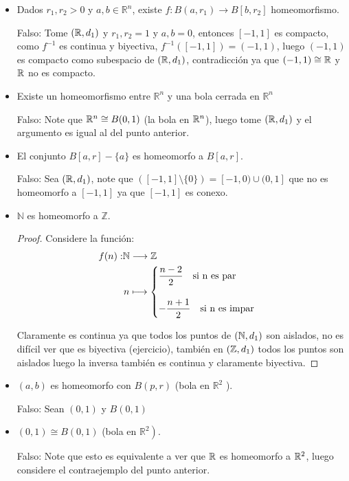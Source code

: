 \begin{itemize}[label={✎},leftmargin=*]
    \item Dados $r_1, r_2>0$ y $a, b \in \mathbb{R}^n$, existe $f: B\left(a, r_1\right) \rightarrow B\left[b, r_2\right]$ homeomorfismo.

Falso: Tome $(\mathbb{R},d_1)$ y $r_1,r_2=1$ y $a,b=0$, entonces $[-1,1]$ es compacto, como $f^{-1}$ es continua y biyectiva, $f^{-1}([-1,1])=(-1,1)$, luego $(-1,1)$ es compacto como subespacio de $(\mathbb{R},d_1)$, contradicción ya que $(-1,1)\cong \mathbb{R}$ y $\mathbb{R}$ no es compacto. 

\item Existe un homeomorfismo entre $\mathbb{R}^n$ y una bola cerrada en $\mathbb{R}^n$

Falso: Note que $\mathbb{R}^n\cong B(0,1)$ (la bola en $\mathbb{R}^n$), luego tome $(\mathbb{R},d_1)$ y el argumento es igual al del punto anterior. 

\item El conjunto $B[a, r]-\{a\}$ es homeomorfo a $B[a, r]$.

Falso: Sea $(\mathbb{R},d_1)$, note que $([-1,1]\setminus \{0\})=[-1,0)\cup(0,1]$ que no es homeomorfo a $[-1,1]$ ya que $[-1,1]$ es conexo.

\item $\mathbb{N}$ es homeomorfo a $\mathbb{Z}$.\\

\begin{proof}
Considere la función:
\begin{align*}
    f(n): &\N \longrightarrow \Z\\
    &\hspace{0.03cm}n \longmapsto \begin{cases}
\dfrac{n-2}{2} \quad \text{si } $n$ \text{ es par}\\\\
-\dfrac{n+1}{2} \quad \text{si } $n$ \text{ es impar}
\end{cases}
\end{align*}

Claramente es continua ya que todos los puntos de $(\mathbb{N},d_1)$ son aislados, no es difícil ver que es biyectiva (ejercicio), también en $(\mathbb{Z},d_1)$ todos los puntos son aislados luego la inversa también es continua y claramente biyectiva.

\end{proof}

\item  $(a, b)$ es homeomorfo con $B(p, r)$ (bola en $\mathbb{R}^2$ ).

Falso: Sean $(0,1)$ y $B(0,1)$


\item   $(0,1) \cong B(0,1)$ (bola en $\left.\mathbb{R}^2\right)$.

Falso: Note que esto es equivalente a ver que $\mathbb{R}$ es homeomorfo a $\mathbb{R}^2$, luego considere el contraejemplo del punto anterior.
\end{itemize}


